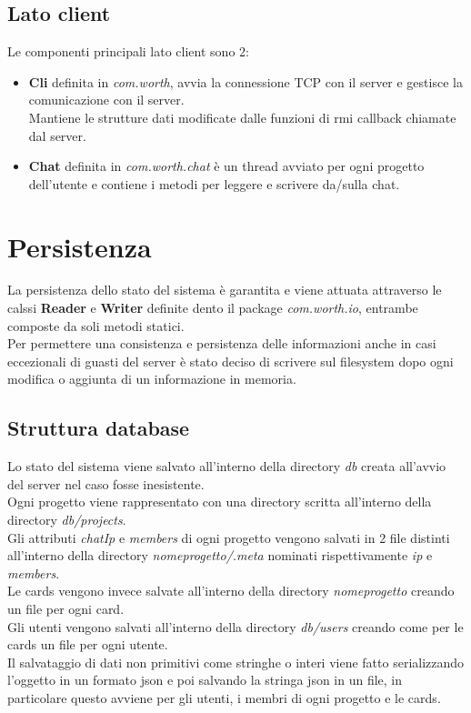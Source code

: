 \documentclass[11pt]{report}
\begin{document}
	\subsection{Lato client}
	Le componenti principali lato client sono 2:
	
	\begin{itemize}
		\item \textbf{Cli} definita in \textit{com.worth}, avvia la connessione TCP con il server e gestisce la comunicazione con il server.\\
		Mantiene le strutture dati modificate dalle funzioni di rmi callback chiamate dal server.
		
		\item \textbf{Chat} definita in \textit{com.worth.chat} è un thread avviato per ogni progetto dell'utente e contiene i metodi per leggere e scrivere da/sulla chat.
	\end{itemize}
		 
	
	\section{Persistenza}
	La persistenza dello stato del sistema è garantita e viene attuata attraverso le calssi \textbf{Reader} e \textbf{Writer} definite dento il package \textit{com.worth.io}, entrambe composte da soli metodi statici. \\
	Per permettere una consistenza e persistenza delle informazioni anche in casi eccezionali di guasti del server è stato deciso di scrivere sul filesystem dopo ogni modifica o aggiunta di un informazione in memoria.
	
	\subsection{Struttura database}
	Lo stato del sistema viene salvato all'interno della directory \textit{db} creata all'avvio del server nel caso fosse inesistente.\\
	Ogni progetto viene rappresentato con una directory scritta all'interno della directory \textit{db/projects}. \\
	Gli attributi \textit{chatIp} e \textit{members} di ogni progetto vengono salvati in 2 file distinti all'interno della directory \textit{nomeprogetto/.meta} nominati rispettivamente \textit{ip} e \textit{members}. \\
	Le cards vengono invece salvate all'interno della directory \textit{nomeprogetto} creando un file per ogni card. \\
	Gli utenti vengono salvati all'interno della directory \textit{db/users} creando come per le cards un file per ogni utente. \\
	Il salvataggio di dati non primitivi come stringhe o interi viene fatto serializzando l'oggetto in un formato json e poi salvando la stringa json in un file, in particolare questo avviene per gli utenti, i membri di ogni progetto e le cards.
	
\end{document}
